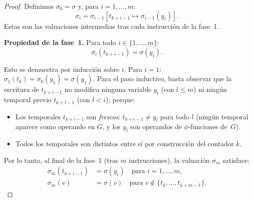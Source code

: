 \documentclass[12pt, a4paper]{article}
\begin{document}
\begin{proof}


Definimos $\sigma_0 = \sigma$ y, para $i = 1, \ldots, m$:
\[
  \sigma_i = \sigma_{i-1}[t_{k+i-1} \mapsto \sigma_{i-1}(y_i)].
\]
Estas son las valuaciones intermedias tras cada instrucción de la fase~1.

\medskip
\textbf{Propiedad de la fase~1.} Para todo $i \in \{1, \ldots, m\}$:
\[
  \sigma_i(t_{k+i-1}) = \sigma(y_i).
\]

Esto se demuestra por inducción sobre $i$. Para $i = 1$:
$\sigma_1(t_k) = \sigma_0(y_1) = \sigma(y_1)$.
Para el paso inductivo, basta observar que la escritura de $t_{k+i-1}$ no modifica
ninguna variable $y_l$ (con $l \leq m$) ni ningún temporal previo $t_{k+l-1}$ (con $l < i$),
porque:
\begin{itemize}
  \item Los temporales $t_{k+i-1}$ son \emph{frescos}: $t_{k+i-1} \neq y_l$ para todo $l$
    (ningún temporal aparece como operando en $G$, y los $y_l$ son operandos de $\phi$-funciones
    de~$G$).
  \item Todos los temporales son distintos entre sí por construcción del contador $k$.
\end{itemize}

Por lo tanto, al final de la fase~1 (tras $m$ instrucciones), la valuación $\sigma_m$ satisface:
\begin{align}
  \sigma_m(t_{k+i-1}) &= \sigma(y_i) \quad \text{para } i = 1, \ldots, m, \label{eq:phase1-temps}\\
  \sigma_m(v) &= \sigma(v) \quad \text{para } v \notin \{t_k, \ldots, t_{k+m-1}\}. \label{eq:phase1-rest}
\end{align}


\end{proof}
\end{document}
